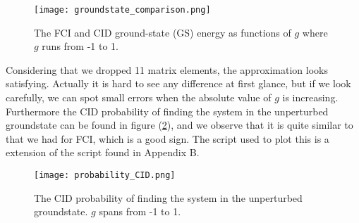 \documentclass[norsk,a4paper,12pt]{article}
\begin{document}
\begin{figure}[H]
\centering
\texttt{[image: groundstate\_comparison.png]}
\caption{The FCI and CID ground-state (GS) energy as functions of $g$ where $g$ runs from -1 to 1.  \label{fig:groundstate_comparison}}
\end{figure}

Considering that we dropped 11 matrix elements, the approximation looks satisfying. Actually it is hard to see any difference at first glance, but if we look carefully, we can spot small errors when the absolute value of $g$ is increasing. Furthermore the CID probability of finding the system in the unperturbed groundstate can be found in figure (\ref{fig:prob_CID}), and we observe that it is quite similar to that we had for FCI, which is a good sign. The script used to plot this is a extension of the script found in Appendix B. 

\begin{figure}[H]
\centering
\texttt{[image: probability\_CID.png]}
\caption{The CID probability of finding the system in the unperturbed groundstate. $g$ spans from -1 to 1.\label{fig:prob_CID}}
\end{figure}
\end{document}
